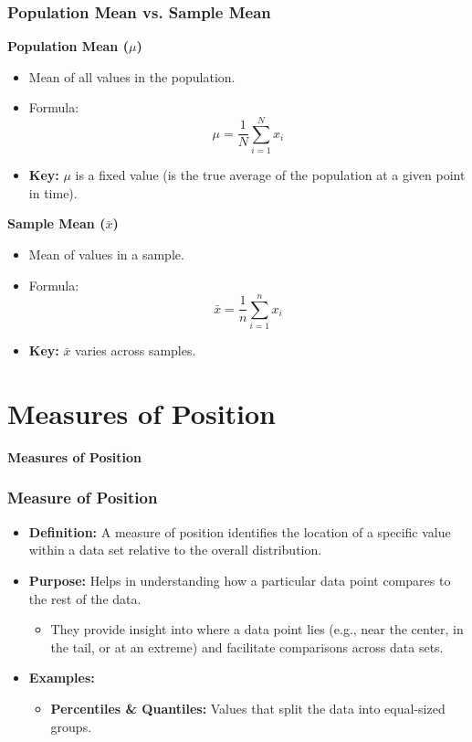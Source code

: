 \documentclass[handout]{beamer} %
\newcommand{\transitionslide}[1]{
    \begin{frame}[plain]
          \addtocounter{framenumber}{-1}
        \centering
        \vspace{1cm}
        \Huge
        \textcolor{moonstoneblue!150}{\textbf{#1}}
    \end{frame}
}
\begin{document}
\begin{frame}
\frametitle{Population Mean vs. Sample Mean}

\begin{minipage}{0.48\textwidth}
\centering
\textbf{Population Mean (\(\mu\))}

\begin{itemize}
    \item Mean of all values in the population.
    \item Formula:
    \[
    \mu = \frac{1}{N} \sum_{i=1}^{N} x_i
    \]
    \item \textbf{Key:} $\mu$ is a fixed value (is the true average of the population at a given point in time).
\end{itemize}
\end{minipage}
\hfill
\begin{minipage}{0.48\textwidth}
\centering
\vspace{-3em}
\textbf{Sample Mean (\(\bar{x}\))}

\begin{itemize}
    \item Mean of values in a sample.
    \item Formula:
    \[
    \bar{x} = \frac{1}{n} \sum_{i=1}^{n} x_i
    \]
    \item \textbf{Key:} $\bar{x}$ varies across samples.
\end{itemize}
\end{minipage}

\end{frame}

\section{Measures of Position}
\transitionslide{Measures of Position}

\begin{frame} \frametitle{Measure of Position}
\begin{itemize}
\item \textbf{Definition:} A measure of position identifies the location of a specific value within a data set relative to the overall distribution.
\item \textbf{Purpose:} Helps in understanding how a particular data point compares to the rest of the data.
\begin{itemize}
    \item They provide insight into where a data point lies (e.g., near the center, in the tail, or at an extreme) and facilitate comparisons across data sets.
\end{itemize}
\item \textbf{Examples:}
\begin{itemize}
    \item \textbf{Percentiles \& Quantiles:} Values that split the data into equal-sized groups.
\end{itemize}

\end{itemize}
\end{frame}
\end{document}
